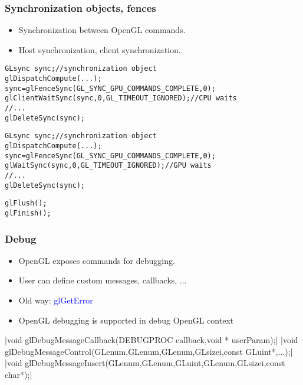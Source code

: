 \begin{frame}[fragile]
\frametitle{Synchronization objects, fences}
  \begin{itemize}
    \item Synchronization between OpenGL commands.
    \item Host synchronization, client synchronization.
  \end{itemize}
{\scriptsize
\begin{verbatim}
GLsync sync;//synchronization object
glDispatchCompute(...);
sync=glFenceSync(GL_SYNC_GPU_COMMANDS_COMPLETE,0);
glClientWaitSync(sync,0,GL_TIMEOUT_IGNORED);//CPU waits
//...
glDeleteSync(sync);
\end{verbatim}
}
{\scriptsize
\begin{verbatim}
GLsync sync;//synchronization object
glDispatchCompute(...);
sync=glFenceSync(GL_SYNC_GPU_COMMANDS_COMPLETE,0);
glWaitSync(sync,0,GL_TIMEOUT_IGNORED);//GPU waits
//...
glDeleteSync(sync);
\end{verbatim}
}
{\scriptsize
\begin{verbatim}
glFlush();
glFinish();
\end{verbatim}
}
\end{frame}


\begin{frame}
\frametitle{Debug}
	\begin{itemize}
	\item OpenGL exposes commands for debugging.
	\item User can define custom messages, callbacks, ...
	\item Old way: \textcolor{blue}{glGetError}
	\item OpenGL debugging is supported in debug OpenGL context
	\end{itemize}
	{\scriptsize
	|void glDebugMessageCallback(DEBUGPROC callback,void * userParam);|
	|void glDebugMessageControl(GLenum,GLenum,GLenum,GLsizei,const GLuint*,...);|
	|void glDebugMessageInsert(GLenum,GLenum,GLuint,GLenum,GLsizei,const char*);|
	}
\end{frame}

